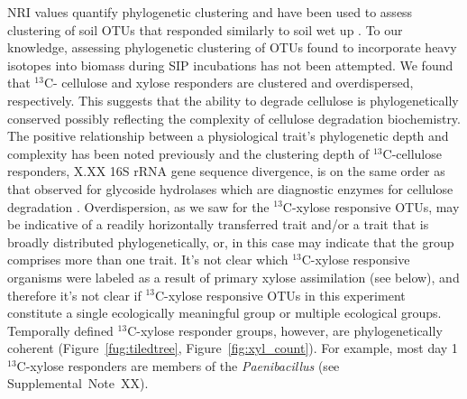 NRI values quantify phylogenetic clustering \citep{Webb2000} and have 
been used to assess clustering of soil OTUs that responded similarly to soil
wet up \citep{Evans2014a,Placella2012}. To our knowledge, assessing
phylogenetic clustering of OTUs found to incorporate heavy isotopes into
biomass during SIP incubations has not been attempted. We found that $^{13}$C-
cellulose and xylose responders are clustered and overdispersed, respectively.
This suggests that the ability to degrade cellulose is phylogenetically
conserved possibly reflecting the complexity of cellulose degradation
biochemistry. The positive relationship between a physiological trait's
phylogenetic depth and complexity has been noted previously
\citep{Martiny2013a} and the clustering depth of $^{13}$C-cellulose responders,
X.XX 16S rRNA gene sequence divergence, is on the same order as that observed
for glycoside hydrolases which are diagnostic enzymes for cellulose degradation
\citep{Berlemont2013}. Overdispersion, as we saw for the $^{13}$C-xylose
responsive OTUs, may be indicative of a readily horizontally transferred trait
and/or a trait that is broadly distributed phylogenetically, or, in this case
may indicate that the group comprises more than one trait. It's not clear
which $^{13}$C-xylose responsive organisms were labeled as a result of primary
xylose assimilation (see below), and therefore it's not clear if
$^{13}$C-xylose responsive OTUs in this experiment constitute a single
ecologically meaningful group or multiple ecological groups. Temporally defined
$^{13}$C-xylose responder groups, however, are phylogenetically coherent
(Figure~\ref{fug:tiledtree}, Figure~\ref{fig:xyl_count}). For example, most day
1 $^{13}$C-xylose responders are members of the \textit{Paenibacillus}
(see Supplemental~Note~XX).

